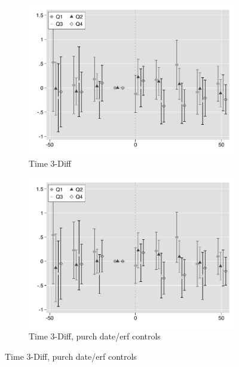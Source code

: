 \documentclass[12pt]{article}
\begin{document}
\begin{figure}
 \begin{subfigure}[b]{0.48\textwidth}
                    \caption[Network2]%
            {{\footnotesize Time 3-Diff}}    
            \label{fig:prefor}
            \centering
            \includegraphics[width=\textwidth,trim={0.3cm .3cm 0.1cm 0cm}, clip=true]{figures/price_time_3d_no_ctrl_q}
        \end{subfigure}
        \hfill
        \begin{subfigure}[b]{0.48\textwidth}
                    \caption[Network2]%
            {{\footnotesize Time 3-Diff, purch date/erf controls}}    
            \label{fig:prefor}
            \centering
            \includegraphics[width=\textwidth,trim={0.3cm .3cm 0.1cm 0cm}, clip=true]{figures/price_time_3d_ctrl_q}

\end{subfigure}
\end{figure}
\end{document}
